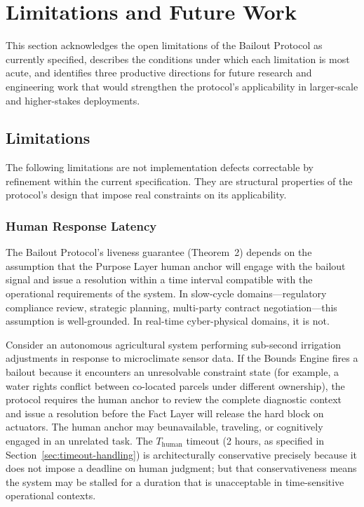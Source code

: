 \section{Limitations and Future Work}\label{sec:limitations}

This section acknowledges the open limitations of the Bailout Protocol as currently specified, describes the conditions under which each limitation is most acute, and identifies three productive directions for future research and engineering work that would strengthen the protocol's applicability in larger-scale and higher-stakes deployments.

\subsection{Limitations}\label{sec:limitations:subsection}

The following limitations are not implementation defects correctable by refinement within the current specification. They are structural properties of the protocol's design that impose real constraints on its applicability.

\subsubsection{Human Response Latency}\label{sec:human-response-latency}

The Bailout Protocol's liveness guarantee (Theorem~2) depends on the assumption that the Purpose Layer human anchor will engage with the bailout signal and issue a resolution within a time interval compatible with the operational requirements of the system. In slow-cycle domains---regulatory compliance review, strategic planning, multi-party contract negotiation---this assumption is well-grounded. In real-time cyber-physical domains, it is not.

Consider an autonomous agricultural system performing sub-second irrigation adjustments in response to microclimate sensor data. If the Bounds Engine fires a bailout because it encounters an unresolvable constraint state (for example, a water rights conflict between co-located parcels under different ownership), the protocol requires the human anchor to review the complete diagnostic context and issue a resolution before the Fact Layer will release the hard block on actuators. The human anchor may beunavailable, traveling, or cognitively engaged in an unrelated task. The $T_{\text{human}}$ timeout (2 hours, as specified in Section~\ref{sec:timeout-handling}) is architecturally conservative precisely because it does not impose a deadline on human judgment; but that conservativeness means the system may be stalled for a duration that is unacceptable in time-sensitive operational contexts.

